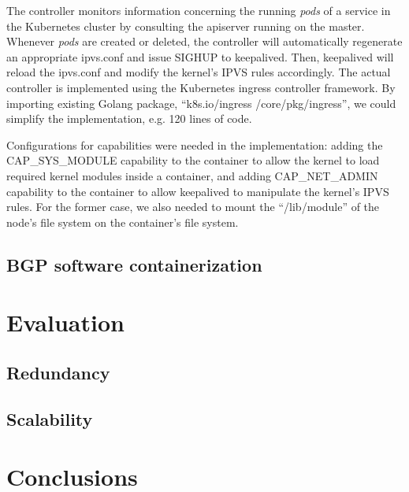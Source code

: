 The controller monitors information concerning the running {\em pods} of a service 
in the Kubernetes cluster by consulting the apiserver running on the master.
Whenever {\em pods} are created or deleted, the controller will automatically regenerate an appropriate ipvs.conf 
and issue SIGHUP to keepalived.
Then, keepalived will reload the ipvs.conf and modify the kernel's IPVS rules accordingly.
The actual controller\cite{ktaka_ccmp_2017_826894} is implemented using the Kubernetes ingress controller\cite{K8sIngress2017} framework. 
By importing existing Golang package, \enquote{k8s.io/ingress /core/pkg/ingress}, we could simplify the implementation, e.g. 
120 lines of code.  


Configurations for capabilities were needed in the implementation: adding the CAP\_SYS\_MODULE capability 
to the container to allow the kernel to load required kernel modules inside a container, 
and adding CAP\_NET\_ADMIN capability to the container to allow keepalived to manipulate the kernel's IPVS rules. 
For the former case, we also needed to mount the \enquote{/lib/module} of the node's file system on the container's file system.

\subsection{BGP software containerization}


\section{Evaluation}\label{Evaluation}

\subsection{Redundancy}\label{Redundancy}

\subsection{Scalability}\label{Scalability}


\section{Conclusions}\label{Conclusions}

